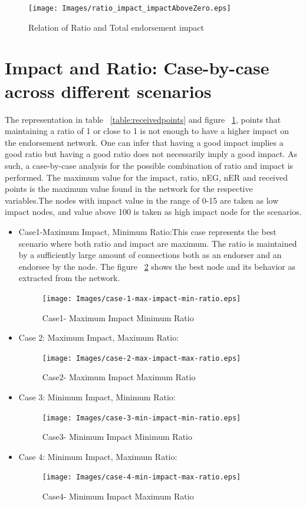\begin{figure}[h]
	\texttt{[image: Images/ratio\_impact\_impactAboveZero.eps]}
	\caption{Relation of Ratio and Total endorsement impact}
	\label{fig:ratioimpact}
\end{figure}

\section{Impact and Ratio: Case-by-case across different scenarios}
The representation in table ~\ref{table:receivedpoints} and figure
~\ref{fig:ratioimpact}, points that maintaining a ratio of 1 or close to 1 is
not enough to have a higher impact on the endorsement network. One can infer
that having a good impact implies a good ratio but having a good ratio does not
necessarily imply a good impact.
As such, a case-by-case analysis for the possible combination of ratio and
impact is performed. The maximum value for the impact, ratio, nEG, nER and
received points is the maximum value found in the network for the respective
variables.The nodes with impact value in the range of 0-15 are taken as low
impact nodes, and value above 100 is taken as high impact node for the
scenarios.   
\begin{itemize}
	\item Case1-Maximum Impact, Minimum Ratio:This case represents the best scenario where both ratio and
		impact are maximum. The ratio is maintained by a sufficiently large
		amount of connections both as an endorser and an endorsee by the node.
		The figure ~\ref{fig:case1} shows the best node and its behavior as extracted
		from the network.
	\begin{figure}[h]
		\texttt{[image: Images/case-1-max-impact-min-ratio.eps]}
		\caption{Case1- Maximum Impact Minimum Ratio}
		\label{fig:case1}
	\end{figure}
	\item Case 2: Maximum Impact, Maximum Ratio:
	\begin{figure}[h]
		\texttt{[image: Images/case-2-max-impact-max-ratio.eps]}
		\caption{Case2- Maximum Impact Maximum Ratio}
		\label{fig:case2}
	\end{figure}
	\item Case 3: Minimum Impact, Minimum Ratio:
	\begin{figure}[h]
		\texttt{[image: Images/case-3-min-impact-min-ratio.eps]}
		\caption{Case3- Minimum Impact Minimum Ratio}
		\label{fig:case3}
	\end{figure}
	\item Case 4: Minimum Impact, Maximum Ratio: 
	\begin{figure}[h]
		\texttt{[image: Images/case-4-min-impact-max-ratio.eps]}
		\caption{Case4- Minimum Impact Maximum Ratio}
		\label{fig:case4}
	\end{figure}
\end{itemize}


